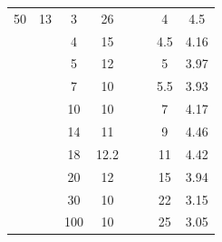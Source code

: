 \documentclass{report}
\begin{document}
\begin{table}
\begin{tabular}{|c|c||c|c||c|c||c|c|}
50   & 13   & 3     & 26   &      &     & 4      & 4.5  \\
     &      & 4     & 15   &      &     & 4.5    & 4.16 \\
     &      & 5     & 12   &      &     & 5      & 3.97 \\
     &      & 7     & 10   &      &     & 5.5    & 3.93 \\
     &      & 10    & 10   &      &     & 7      & 4.17 \\
     &      & 14    & 11   &      &     & 9      & 4.46 \\
     &      & 18    & 12.2 &      &     & 11     & 4.42 \\
     &      & 20    & 12   &      &     & 15     & 3.94 \\
     &      & 30    & 10   &      &     & 22     & 3.15 \\
     &      & 100   & 10   &      &     & 25     & 3.05 \\
\hline
\end{tabular}
\end{table}
\end{document}
